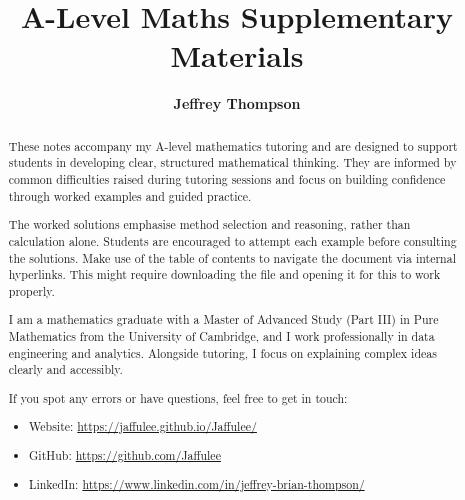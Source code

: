 \documentclass[a4paper]{article}
\theoremstyle{plain} %
\theoremstyle{definition} %
\numberwithin{equation}{subsection}
\begin{document}

\title{\textbf{A-Level Maths Supplementary Materials}}




\author{\textbf{Jeffrey Thompson}}
\maketitle
\begin{abstract}
These notes accompany my A-level mathematics tutoring and are designed to support students in developing clear, structured mathematical thinking. They are informed by common difficulties raised during tutoring sessions and focus on building confidence through worked examples and guided practice.

The worked solutions emphasise method selection and reasoning, rather than calculation alone. Students are encouraged to attempt each example before consulting the solutions. Make use of the table of contents to navigate the document via internal hyperlinks. This might require downloading the file and opening it for this to work properly.

I am a mathematics graduate with a Master of Advanced Study (Part III) in Pure Mathematics from the University of Cambridge, and I work professionally in data engineering and analytics. Alongside tutoring, I focus on explaining complex ideas clearly and accessibly.

If you spot any errors or have questions, feel free to get in touch:
\begin{itemize}
  \item Website: \url{https://jaffulee.github.io/Jaffulee/}
  \item GitHub: \url{https://github.com/Jaffulee}
  \item LinkedIn: \url{https://www.linkedin.com/in/jeffrey-brian-thompson/}
\end{itemize}

\end{abstract}
\tableofcontents
\end{document}
